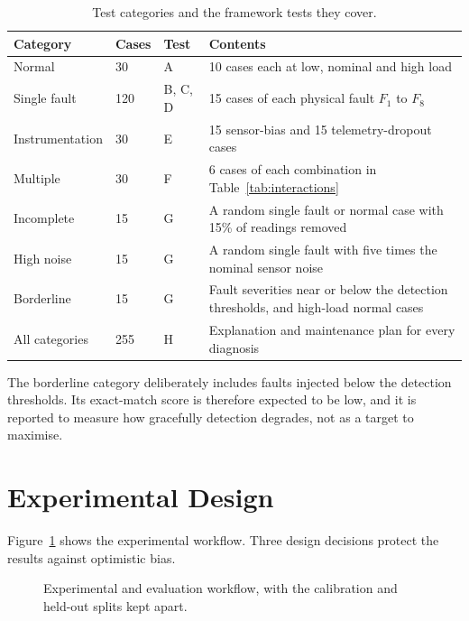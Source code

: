 \begin{table}[htbp]
  \centering
  \small
  \caption{Test categories and the framework tests they cover.}
  \label{tab:test-categories}
  \begin{tabular}{L{2.6cm}L{1.0cm}L{1.6cm}L{8.8cm}}
    \toprule
    Category & Cases & Test & Contents \\
    \midrule
    Normal & 30 & A & 10 cases each at low, nominal and high load \\
    Single fault & 120 & B, C, D & 15 cases of each physical fault $F_1$ to $F_8$ \\
    Instrumentation & 30 & E & 15 sensor-bias and 15 telemetry-dropout cases \\
    Multiple & 30 & F & 6 cases of each combination in Table~\ref{tab:interactions} \\
    Incomplete & 15 & G & A random single fault or normal case with 15\% of readings removed \\
    High noise & 15 & G & A random single fault with five times the nominal sensor noise \\
    Borderline & 15 & G & Fault severities near or below the detection thresholds, and high-load normal cases \\
    All categories & 255 & H & Explanation and maintenance plan for every diagnosis \\
    \bottomrule
  \end{tabular}
\end{table}

The borderline category deliberately includes faults injected below the detection thresholds. Its exact-match score is therefore expected to be low, and it is reported to measure how gracefully detection degrades, not as a target to maximise.

\section{Experimental Design}
\label{sec:design}

Figure~\ref{fig:evaluation} shows the experimental workflow. Three design decisions protect the results against optimistic bias.

\begin{figure}[htbp]
  \centering
  
  \caption{Experimental and evaluation workflow, with the calibration and held-out splits kept apart.}
  \label{fig:evaluation}
\end{figure}

